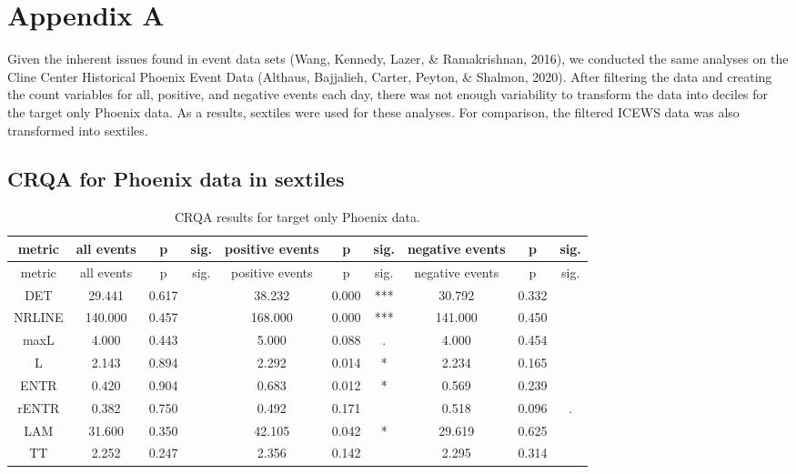 \documentclass[english,man]{apa6}
\begin{document}
\endgroup

\newpage

\hypertarget{appendix-a}{%
\section{Appendix A}\label{appendix-a}}

Given the inherent issues found in event data sets (Wang, Kennedy, Lazer, \& Ramakrishnan, 2016), we conducted the same analyses on the Cline Center Historical Phoenix Event Data (Althaus, Bajjalieh, Carter, Peyton, \& Shalmon, 2020). After filtering the data and creating the count variables for all, positive, and negative events each day, there was not enough variability to transform the data into deciles for the target only Phoenix data. As a results, sextiles were used for these analyses. For comparison, the filtered ICEWS data was also transformed into sextiles.

\hypertarget{crqa-for-phoenix-data-in-sextiles}{%
\subsection{CRQA for Phoenix data in sextiles}\label{crqa-for-phoenix-data-in-sextiles}}

\begin{longtable}[]{@{}cccccccccc@{}}
\caption{CRQA results for target only Phoenix data.}\tabularnewline
\toprule
metric & all events & p & sig. & positive events & p & sig. & negative events & p & sig.\tabularnewline
\midrule
\endfirsthead
\toprule
metric & all events & p & sig. & positive events & p & sig. & negative events & p & sig.\tabularnewline
\midrule
\endhead
DET & 29.441 & 0.617 & & 38.232 & 0.000 & *** & 30.792 & 0.332 &\tabularnewline
NRLINE & 140.000 & 0.457 & & 168.000 & 0.000 & *** & 141.000 & 0.450 &\tabularnewline
maxL & 4.000 & 0.443 & & 5.000 & 0.088 & . & 4.000 & 0.454 &\tabularnewline
L & 2.143 & 0.894 & & 2.292 & 0.014 & * & 2.234 & 0.165 &\tabularnewline
ENTR & 0.420 & 0.904 & & 0.683 & 0.012 & * & 0.569 & 0.239 &\tabularnewline
rENTR & 0.382 & 0.750 & & 0.492 & 0.171 & & 0.518 & 0.096 & .\tabularnewline
LAM & 31.600 & 0.350 & & 42.105 & 0.042 & * & 29.619 & 0.625 &\tabularnewline
TT & 2.252 & 0.247 & & 2.356 & 0.142 & & 2.295 & 0.314 &\tabularnewline
\bottomrule
\end{longtable}
\end{document}
